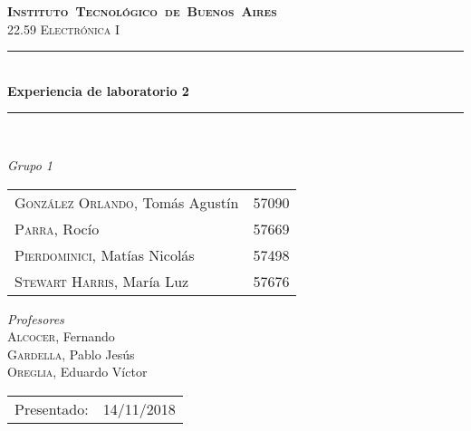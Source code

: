 \begin{titlepage}
\newcommand{\HRule}{\rule{\linewidth}{0.5mm}}
\center
\mbox{\textsc{\LARGE \bfseries {Instituto Tecnol\'ogico de Buenos Aires}}}\\[1.5cm]
\textsc{\Large 22.59 Electr\'onica I}\\[0.5cm]


\HRule \\[0.6cm]
{ \Huge \bfseries Experiencia de laboratorio 2}\\[0.4cm] %
\HRule \\[1.5cm]


{\large

\emph{Grupo 1}\\
\vspace{3px}

\begin{tabular}{lr} 	
\textsc{Gonz\'alez Orlando}, Tom\'as Agust\'in  & 57090 \\
\textsc{Parra}, Roc\'io  & 57669 \\ 	
\textsc{Pierdominici}, Mat\'ias Nicol\'as & 57498 \\     
\textsc{Stewart Harris}, Mar\'ia Luz  & 57676 	
\end{tabular}

\vspace{20px}

\emph{Profesores}\\
\vspace{3px}
\textsc{Alcocer,} Fernando \\ 	
\textsc{Gardella,} Pablo Jesús\\
\textsc{Oreglia,} Eduardo V\'ictor \\

\vspace{100px}

\begin{tabular}{ll}

Presentado: & 14/11/2018\\

\end{tabular}

}

\vfill

\end{titlepage}